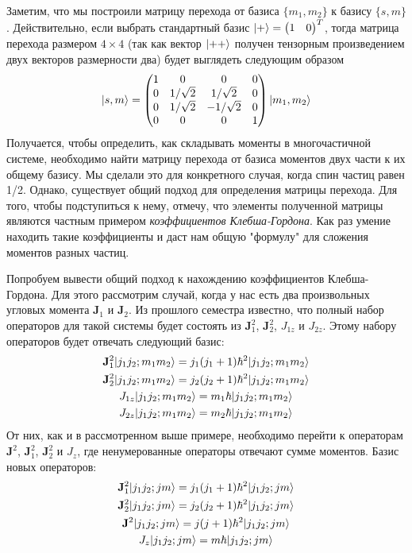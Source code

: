 Заметим, что мы построили матрицу перехода от базиса $\{m_1, m_2\}$ к базису
$\{s, m\}$. Действительно, если выбрать стандартный базис $\lvert+\rangle =
  \begin{pmatrix}1 & 0\end{pmatrix}^T$, тогда матрица перехода размером
$4\times 4$ (так как вектор $\lvert++\rangle$ получен тензорным произведением двух
векторов размерности два) будет выглядеть следующим образом
\[
  \lvert s, m\rangle = \begin{pmatrix}
    1 & 0 & 0 & 0\\
    0 & 1/\sqrt{2} & 1/\sqrt{2} & 0\\
    0 & 1/\sqrt{2} & -1/\sqrt{2} & 0\\
    0 & 0 & 0 & 1\\
  \end{pmatrix} \lvert m_1, m_2\rangle
\]
Получается, чтобы определить, как складывать моменты в многочастичной системе,
необходимо найти матрицу перехода от базиса моментов двух части к их общему
базису. Мы сделали это для конкретного случая, когда спин частиц равен 1/2.
Однако, существует общий подход для определения матрицы перехода. Для того,
чтобы подступиться к нему, отмечу, что элементы полученной матрицы являются
частным примером \textit{коэффициентов Клебша-Гордона}. Как раз умение находить
такие коэффициенты и даст нам общую "формулу" для сложения моментов разных
частиц.

Попробуем вывести общий подход к нахождению коэффициентов Клебша-Гордона. Для
этого рассмотрим случай, когда у нас есть два произвольных угловых момента
$\mathbf{J}_1$ и $\mathbf{J}_2$. Из прошлого семестра известно, что полный
набор операторов для такой системы будет состоять из $\mathbf{J}^2_1$,
$\mathbf{J}^2_2$, $J_{1z}$ и $J_{2z}$. Этому набору операторов будет отвечать
следующий базис:
\begin{gather*}
  \mathbf{J}^2_1\lvert j_1j_2;m_1m_2\rangle = j_1(j_1+1)\hbar^2\lvert j_1j_2; m_1m_2\rangle\\
  \mathbf{J}^2_2\lvert j_1j_2;m_1m_2\rangle = j_2(j_2+1)\hbar^2\lvert j_1j_2; m_1m_2\rangle\\
  J_{1z}\lvert j_1j_2;m_1m_2\rangle = m_1\hbar\lvert j_1j_2; m_1m_2\rangle\\
  J_{2z}\lvert j_1j_2;m_1m_2\rangle = m_2\hbar\lvert j_1j_2; m_1m_2\rangle
\end{gather*}
От них, как и в рассмотренном выше примере, необходимо перейти к операторам
$\mathbf{J}^2$, $\mathbf{J}^2_1$, $\mathbf{J}^2_2$ и $J_z$, где ненумерованные
операторы отвечают сумме моментов. Базис новых операторов:
\begin{gather*}
  \mathbf{J}^2_1\lvert j_1j_2;jm\rangle = j_1(j_1+1)\hbar^2\lvert j_1j_2; jm\rangle\\
  \mathbf{J}^2_2\lvert j_1j_2;jm\rangle = j_2(j_2+1)\hbar^2\lvert j_1j_2; jm\rangle\\
  \mathbf{J}^2\lvert j_1j_2;jm\rangle = j(j+1)\hbar^2\lvert j_1j_2; jm\rangle\\
  J_{z}\lvert j_1j_2;jm\rangle = m\hbar\lvert j_1j_2; jm\rangle
\end{gather*}

